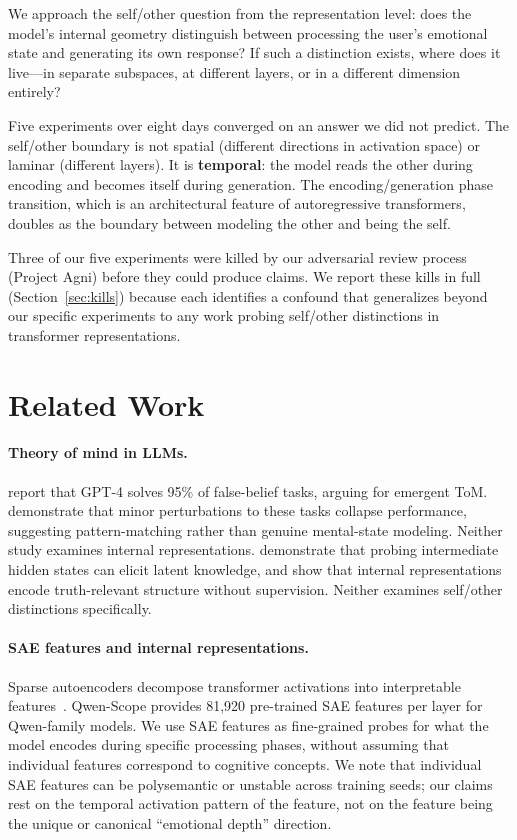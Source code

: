 \documentclass[11pt,a4paper]{article}
\begin{document}
We approach the self/other question from the representation level: does the
model's internal geometry distinguish between processing the user's
emotional state and generating its own response? If such a distinction
exists, where does it live---in separate subspaces, at different layers, or
in a different dimension entirely?

Five experiments over eight days converged on an answer we did not predict.
The self/other boundary is not spatial (different directions in activation
space) or laminar (different layers). It is \textbf{temporal}: the model
reads the other during encoding and becomes itself during generation. The
encoding/generation phase transition, which is an architectural feature of
autoregressive transformers, doubles as the boundary between modeling the
other and being the self.

Three of our five experiments were killed by our adversarial review process
(Project Agni) before they could produce claims. We report these kills in
full (Section~\ref{sec:kills}) because each identifies a confound that
generalizes beyond our specific experiments to any work probing self/other
distinctions in transformer representations.

\section{Related Work}
\label{sec:related}

\paragraph{Theory of mind in LLMs.}
\citet{kosinski2024evaluating} report that GPT-4 solves 95\% of false-belief
tasks, arguing for emergent ToM. \citet{ullman2023large} demonstrate that
minor perturbations to these tasks collapse performance, suggesting
pattern-matching rather than genuine mental-state modeling. Neither study
examines internal representations. \citet{li2024inference} demonstrate that probing intermediate hidden states
can elicit latent knowledge, and \citet{burns2023discovering} show that
internal representations encode truth-relevant structure without
supervision. Neither examines self/other distinctions specifically.

\paragraph{SAE features and internal representations.}
Sparse autoencoders decompose transformer activations into interpretable
features~\citep{bricken2023monosemanticity, cunningham2024sparse,
templeton2024scaling}. Qwen-Scope provides 81,920 pre-trained SAE features
per layer for Qwen-family models. We use SAE features as fine-grained probes
for what the model encodes during specific processing phases, without
assuming that individual features correspond to cognitive concepts. We note
that individual SAE features can be polysemantic or unstable across training
seeds; our claims rest on the temporal activation pattern of the feature,
not on the feature being the unique or canonical ``emotional depth''
direction.
\end{document}
